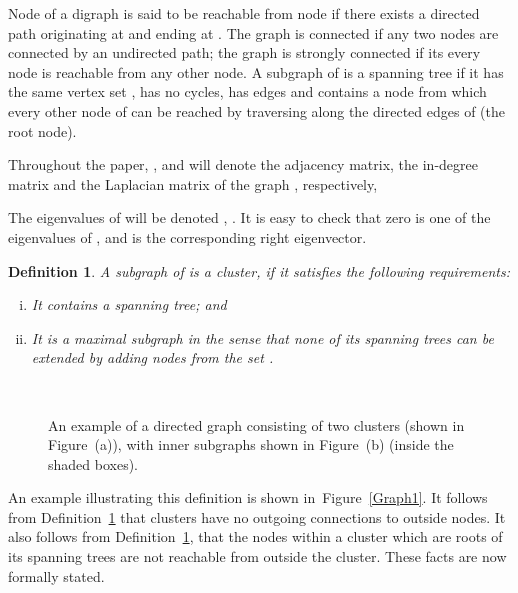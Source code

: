 \documentclass[a4paper,10pt,conference]{ieeeconf}
\newtheorem{definition}{Definition}
\begin{document}
Node  of a digraph is said to be reachable from node  if there exists
a directed path originating at  and ending at . The graph is
connected if any two nodes are connected by an undirected path; the graph is
strongly connected if its every node is reachable from any other node. A
subgraph of  is a spanning tree if it has the same vertex set
, has no cycles, has 
edges and 
contains a node from which every other node of  can be reached
by traversing along the directed edges of  (the root node). 

Throughout the paper, ,  and  will denote
the adjacency matrix, the in-degree matrix and the Laplacian matrix of the
graph , respectively,

The eigenvalues of  will be denoted ,
. It is easy to check that zero is one of the eigenvalues of
, and  is the corresponding right eigenvector. 





\begin{definition}\label{cluster}
A subgraph of  is a \emph{cluster}, if it satisfies the following
requirements:
\begin{enumerate}[(i)]
\item
It contains a spanning tree; and
\item   
It is a maximal subgraph in the sense that none of its spanning trees can
be extended by adding nodes from the set . 
\end{enumerate}   
\end{definition}

\begin{figure}[t]
\mbox{}
\vspace*{10pt}

 \centering
 \\
 \label{Example.Graph}
 \caption{An example of a directed graph consisting of two clusters (shown
   in Figure~(a)), with inner subgraphs shown in Figure~(b) (inside
   the shaded boxes).}
\end{figure}

An example illustrating this definition is shown in~Figure~\ref{Graph1}.
It follows from Definition~\ref{cluster} that clusters have no outgoing
connections to outside nodes. 
It also follows from Definition~\ref{cluster}, that the nodes within a
cluster which are roots of its spanning trees are not reachable from
outside the cluster. These facts are now formally stated.
\end{document}
